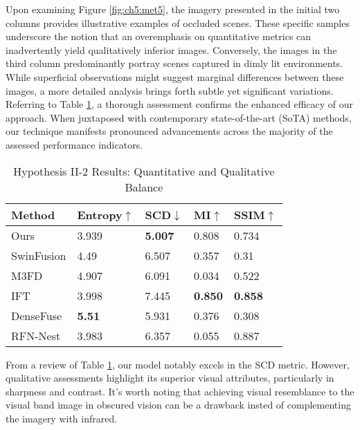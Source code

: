 Upon examining Figure \ref{fig:ch5:met5}, the imagery presented in the initial two columns provides illustrative examples of occluded scenes. These specific samples underscore the notion that an overemphasis on quantitative metrics can inadvertently yield qualitatively inferior images. Conversely, the images in the third column predominantly portray scenes captured in dimly lit environments. While superficial observations might suggest marginal differences between these images, a more detailed analysis brings forth subtle yet significant variations. Referring to Table \ref{tab:ch5:met5}, a thorough assessment confirms the enhanced efficacy of our approach. When juxtaposed with contemporary state-of-the-art (SoTA) methods, our technique manifests pronounced advancements across the majority of the assessed performance indicators.

\begin{table}[htbp]
    \centering
    \caption{Hypothesis II-2 Results: Quantitative and Qualitative Balance}
    \label{tab:ch5:met5}
    \begin{tabular}{|l|l|l|l|l|}
        \hline
        \textbf{Method} & \textbf{Entropy\cite{roberts2008assessment}$\uparrow$ } & \textbf{SCD\cite{aslantas2015new}$\downarrow$} & \textbf{MI\cite{qu2002information}$\uparrow$} & \textbf{SSIM\cite{ma2015perceptual}$\uparrow$} \\ \hline
        Ours & 3.939 & \textbf{5.007} & 0.808 & 0.734 \\ \hline
        SwinFusion\cite{ma2022swinfusion} & 4.49 & 6.507 & 0.357 & 0.31 \\ \hline
        M3FD\cite{liu2022target} & 4.907 & 6.091 & 0.034 & 0.522 \\ \hline
        IFT\cite{vs2022image} & 3.998 & 7.445 & \textbf{0.850} & \textbf{0.858} \\ \hline
        DenseFuse\cite{li2019infrared} & \textbf{5.51} & 5.931 & 0.376 & 0.308 \\ \hline
        RFN-Nest\cite{li2021rfn}& 3.983 & 6.357 & 0.055 & 0.887 \\ \hline
    \end{tabular}
\end{table}

From a review of Table \ref{tab:ch5:met5}, our model notably excels in the SCD\cite{aslantas2015new} metric. However, qualitative assessments highlight its superior visual attributes, particularly in sharpness and contrast. It's worth noting that achieving visual resemblance to the visual band image in obscured vision can be a drawback insted of complementing the imagery with infrared.

